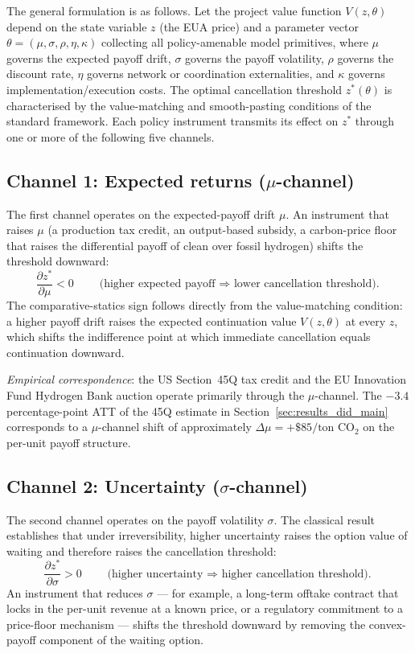 The general formulation is as follows. Let the project value function $V(z, \theta)$ depend on the state variable $z$ (the EUA price) and a parameter vector $\theta = (\mu, \sigma, \rho, \eta, \kappa)$ collecting all policy-amenable model primitives, where $\mu$ governs the expected payoff drift, $\sigma$ governs the payoff volatility, $\rho$ governs the discount rate, $\eta$ governs network or coordination externalities, and $\kappa$ governs implementation/execution costs. The optimal cancellation threshold $z^*(\theta)$ is characterised by the value-matching and smooth-pasting conditions of the standard \cite{dixit1994investment} framework. Each policy instrument transmits its effect on $z^*$ through one or more of the following five channels.

\subsection{Channel 1: Expected returns ($\mu$-channel)}
\label{sec:ch3-channel-mu}

The first channel operates on the expected-payoff drift $\mu$. An instrument that raises $\mu$ (a production tax credit, an output-based subsidy, a carbon-price floor that raises the differential payoff of clean over fossil hydrogen) shifts the threshold downward:
\[
\frac{\partial z^*}{\partial \mu} < 0 \qquad \text{(higher expected payoff $\Rightarrow$ lower cancellation threshold).}
\]
The comparative-statics sign follows directly from the value-matching condition: a higher payoff drift raises the expected continuation value $V(z, \theta)$ at every $z$, which shifts the indifference point at which immediate cancellation equals continuation downward.

\emph{Empirical correspondence}: the US Section~45Q tax credit and the EU Innovation Fund Hydrogen Bank auction operate primarily through the $\mu$-channel. The $-3.4$ percentage-point ATT of the 45Q estimate in Section~\ref{sec:results_did_main} corresponds to a $\mu$-channel shift of approximately $\Delta\mu = +\$85 / \text{ton CO}_2$ on the per-unit payoff structure.

\subsection{Channel 2: Uncertainty ($\sigma$-channel)}
\label{sec:ch3-channel-sigma}

The second channel operates on the payoff volatility $\sigma$. The classical \cite{mcdonald1986value} result establishes that under irreversibility, higher uncertainty raises the option value of waiting and therefore raises the cancellation threshold:
\[
\frac{\partial z^*}{\partial \sigma} > 0 \qquad \text{(higher uncertainty $\Rightarrow$ higher cancellation threshold).}
\]
An instrument that reduces $\sigma$ --- for example, a long-term offtake contract that locks in the per-unit revenue at a known price, or a regulatory commitment to a price-floor mechanism --- shifts the threshold downward by removing the convex-payoff component of the waiting option.

